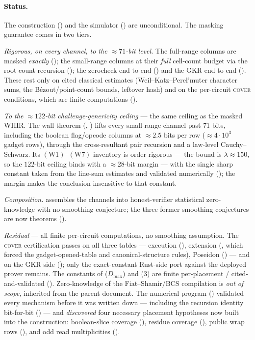 \documentclass{article}
\theoremstyle{definition}
\begin{document}
\paragraph{Status.} The construction () and the simulator () are unconditional. The masking guarantee comes in two tiers.

\emph{Rigorous, on every channel, to the $\approx 71$-bit level.} The full-range columns are masked \emph{exactly} (); the small-range columns at their \emph{full} cell-count budget via the root-count recursion (); the zerocheck end to end () and the GKR end to end (). These rest only on cited classical estimates (Weil--Katz--Perel'muter character sums, the B\'ezout/point-count bounds, leftover hash) and on the per-circuit \textsc{cover} conditions, which are finite computations ().

\emph{To the $\approx 122$-bit challenge-genericity ceiling} --- the same ceiling as the masked WHIR. The wall theorem (, ) lifts every small-range channel past $71$ bits, including the boolean flag/opcode columns at $\approx 2.5$ bits per row ($\approx 4\cdot10^3$ gadget rows), through the cross-resultant pair recursion and a law-level Cauchy--Schwarz. Its $(\text{W1})$--$(\text{W7})$ inventory is order-rigorous --- the bound is $\lambda \approx 150$, so the $122$-bit ceiling binds with a $\approx 28$-bit margin --- with the single sharp constant taken from the line-sum estimates and validated numerically (); the margin makes the conclusion insensitive to that constant.

\emph{Composition.}  assembles the channels into honest-verifier statistical zero-knowledge with no smoothing conjecture; the three former smoothing conjectures are now theorems ().

\emph{Residual} --- all finite per-circuit computations, no smoothing assumption. The \textsc{cover} certification passes on all three tables --- execution (), extension (, which forced the gadget-opened-table and canonical-structure rules), Poseidon () --- and on the GKR side (); only the exact-constant Rust-side port against the deployed prover remains. The constants of  ($D_{\max}$) and (3) are finite per-placement / cited-and-validated (). Zero-knowledge of the Fiat--Shamir/BCS compilation is \emph{out of scope}, inherited from the parent document. The numerical program () validated every mechanism before it was written down --- including the recursion identity bit-for-bit () --- and \emph{discovered} four necessary placement hypotheses now built into the construction: boolean-slice coverage (), residue coverage (), public wrap rows (), and odd read multiplicities ().
\end{document}
